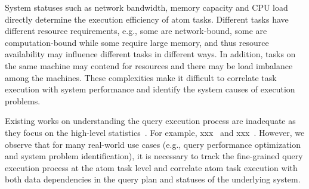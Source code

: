  System statuses such as network bandwidth, memory capacity and CPU load directly determine the execution efficiency of atom tasks. Different tasks have different resource requirements, e.g., some are network-bound, some are computation-bound while some require large memory, and thus resource availability may influence different tasks in different ways. In addition, tasks on the same machine may contend for resources and there may be load imbalance among the machines. These complexities make it difficult to correlate task execution with system performance and identify the system causes of execution problems.     


Existing works on understanding the query execution process are inadequate as they focus on the high-level statistics~\cite{}. For example, xxx~\cite{} and xxx~\cite{}. However, we observe that for many real-world use cases (e.g., query performance optimization and system problem identification), it is necessary to track the fine-grained query execution process at the atom task level and correlate atom task execution with both data dependencies in the query plan and statuses of the underlying system.           



